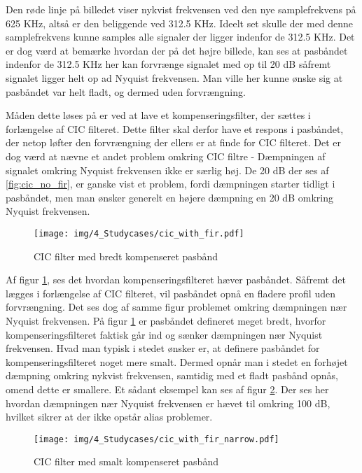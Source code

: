 \begin{appendices}
Den røde linje på billedet viser nykvist frekvensen ved den nye samplefrekvens på 625 KHz, altså er den beliggende ved 312.5 KHz. Ideelt set skulle der med denne samplefrekvens kunne samples alle signaler der ligger indenfor de 312.5 KHz. Det er dog værd at bemærke hvordan der på det højre billede, kan ses at pasbåndet indenfor de 312.5 KHz her kan forvrænge signalet med op til 20 dB såfremt signalet ligger helt op ad Nyquist frekvensen. Man ville her kunne ønske sig at pasbåndet var helt fladt, og dermed uden forvrængning. 

Måden dette løses på er ved at lave et kompenseringsfilter, der sættes i forlængelse af CIC filteret. Dette filter skal derfor have et respons i pasbåndet, der netop løfter den forvrængning der ellers er at finde for CIC filteret. Det er dog værd at nævne et andet problem omkring CIC filtre - Dæmpningen af signalet omkring Nyquist frekvensen ikke er særlig høj. De 20 dB der ses af \ref{fig:cic_no_fir}, er ganske vist et problem, fordi dæmpningen starter tidligt i pasbåndet, men man ønsker generelt en højere dæmpning en 20 dB omkring Nyquist frekvensen. 

\begin{figure}[H]
	\centering{}
	\texttt{[image: img/4\_Studycases/cic\_with\_fir.pdf]}
	\caption{CIC filter med bredt kompenseret pasbånd}
	\label{fig:cic_with_fir}
\end{figure} 

Af figur \ref{fig:cic_with_fir}, ses det hvordan kompenseringsfilteret hæver pasbåndet. Såfremt det lægges i forlængelse af CIC filteret, vil pasbåndet opnå en fladere profil uden forvrængning. Det ses dog af samme figur problemet omkring dæmpningen nær Nyquist frekvensen. På figur \ref{fig:cic_with_fir} er pasbåndet defineret meget bredt, hvorfor kompenseringsfilteret faktisk går ind og sænker dæmpningen nær Nyquist frekvensen. Hvad man typisk i stedet ønsker er, at definere pasbåndet for kompenseringsfilteret noget mere smalt. Dermed opnår man i stedet en forhøjet dæmpning omkring nykvist frekvensen, samtidig med et fladt pasbånd opnås, omend dette er smallere. Et sådant eksempel kan ses af figur \ref{fig:cic_with_fir_narrow}. Der ses her hvordan dæmpningen nær Nyquist frekvensen er hævet til omkring 100 dB, hvilket sikrer at der ikke opstår alias problemer.

\begin{figure}[H]
	\centering{}
	\texttt{[image: img/4\_Studycases/cic\_with\_fir\_narrow.pdf]}
	\caption{CIC filter med smalt kompenseret pasbånd}
	\label{fig:cic_with_fir_narrow}
\end{figure} 


\end{appendices}
